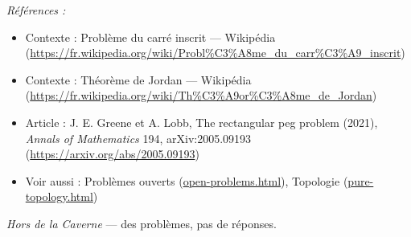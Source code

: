 \documentclass[11pt]{article}
\newenvironment{refs}{\par\small\noindent\emph{Références :}\begin{itemize}\setlength\itemsep{0pt}}{\end{itemize}\normalsize}
\begin{document}
\begin{refs}
\item Contexte : Problème du carré inscrit --- Wikipédia (\url{https://fr.wikipedia.org/wiki/Probl%C3%A8me_du_carr%C3%A9_inscrit})
\item Contexte : Théorème de Jordan --- Wikipédia (\url{https://fr.wikipedia.org/wiki/Th%C3%A9or%C3%A8me_de_Jordan})
\item Article : J. E. Greene et A. Lobb, \og{} The rectangular peg problem \fg{} (2021), \textit{Annals of Mathematics} 194, arXiv:2005.09193 (\url{https://arxiv.org/abs/2005.09193})
\item Voir aussi : Problèmes ouverts (\url{open-problems.html}), Topologie (\url{pure-topology.html})
\end{refs}

\bigskip


\vfill
\noindent\emph{Hors de la Caverne} --- des probl\`emes, pas de r\'eponses.
\end{document}
